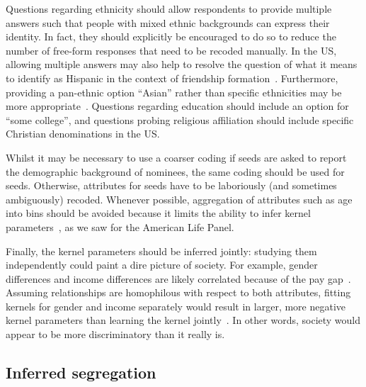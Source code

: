 \documentclass{scrartcl}
\begin{document}
Questions regarding ethnicity should allow respondents to provide multiple answers such that people with mixed ethnic backgrounds can express their identity. In fact, they should explicitly be encouraged to do so to reduce the number of free-form responses that need to be recoded manually. In the US, allowing multiple answers may also help to resolve the question of what it means to identify as Hispanic in the context of friendship formation~\cite{Smith2017a}. Furthermore, providing a pan-ethnic option ``Asian'' rather than specific ethnicities may be more appropriate~\cite{Oyserman1997}. Questions regarding education should include an option for ``some college'', and questions probing religious affiliation should include specific Christian denominations in the US.\@

Whilst it may be necessary to use a coarser coding if seeds are asked to report the demographic background of nominees, the same coding should be used for seeds. Otherwise, attributes for seeds have to be laboriously (and sometimes ambiguously) recoded. Whenever possible, aggregation of attributes such as age into bins should be avoided because it limits the ability to infer kernel parameters~\cite{Hutcheon2010}, as we saw for the American Life Panel.

Finally, the kernel parameters should be inferred jointly: studying them independently could paint a dire picture of society. For example, gender differences and income differences are likely correlated because of the pay gap~\cite{Arulampalam2007}. Assuming relationships are homophilous with respect to both attributes, fitting kernels for gender and income separately would result in larger, more negative kernel parameters than learning the kernel jointly~\cite{Smith2014}. In other words, society would appear to be more discriminatory than it really is.

\subsection{Inferred segregation}
\end{document}
